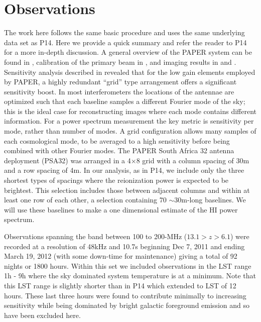\documentclass[preprint]{aastex}
\begin{document}
\section{Observations}
\label{sec:observations}
The work here follows the same basic procedure and uses the same underlying data set as P14. Here we provide a quick summary and refer the reader to P14 for a more in-depth discussion.  A general overview of the PAPER system can be found in \cite{Parsons:2010p6757}, calibration of the primary beam in \cite{Pober:2012p8800}, and imaging results in \cite{Jacobs:2011p8438,jacobs:2013b} and \citet{Stefan:2013p9926}.  Sensitivity analysis described in \cite{Parsons:2012p9028} revealed that for the low gain elements employed by PAPER, a highly redundant ``grid'' type arrangement offers a significant sensitivity boost.  In most interferometers the locations of the antennae are optimized such that each baseline samples a different Fourier mode of the sky; this is the ideal case for reconstructing images where each mode contains different information.  For a power spectrum measurement the key metric is sensitivity per mode, rather than number of modes.  A grid configuration allows many samples of each cosmological mode, to be averaged to a high sensitivity before being combined with other Fourier modes.  The PAPER South Africa 32 antenna deployment (PSA32) was arranged in a 4$\times$8 grid with a column spacing of 30m and a row spacing of 4m.  In our analysis, as in P14, we include only the three shortest types of spacings where the reionization power is expected to be brightest. This selection includes those between adjacent columns and within at least one row of each other, a selection containing 70 $\sim$30m-long baselines.  We will use these baselines to make a one dimensional estimate of the HI power spectrum.

Observations spanning the band between 100 to 200-MHz ($13.1>z>6.1$) were recorded at a resolution of 48kHz and 10.7s  beginning Dec 7, 2011 and ending March 19, 2012 (with some down-time for maintenance) giving a total of 92 nights or 1800 hours.  Within this set we included observations in the LST range 1h - 9h where the sky dominated system temperature is at a minimum.  Note that this LST range is slightly shorter than in P14 which extended to LST of 12 hours. These last three hours were found to contribute minimally to increasing sensitivity while being dominated by bright galactic foreground emission and so have been excluded here.
\end{document}

